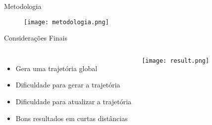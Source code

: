 \begin{frame}[c]{Metodologia}
    \begin{figure}
        \texttt{[image: metodologia.png]}
    \end{figure}
\end{frame}
\begin{frame}[c]{Considerações Finais}
    \begin{columns}
            \begin{itemize}
                \item Gera uma trajetória global
                \item Dificuldade para gerar a trajetória
                \item Dificuldade para atualizar a trajetória
                \item Bons resultados em curtas distâncias
            \end{itemize}
             \texttt{[image: result.png]}
    \end{columns}
\end{frame}
